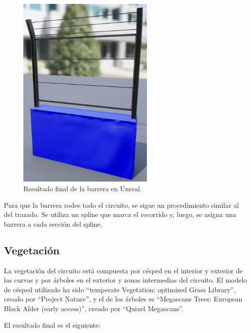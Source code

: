 \begin{figure}[H]
    \centering
    \includegraphics[width=0.6\textwidth]{imagenes/barrier/barrierfence.png}
    \caption{Resultado final de la barrera en Unreal.}
    \label{fig:barreraFinal}
\end{figure}

Para que la barrera rodee todo el circuito, se sigue un procedimiento similar al del trazado. Se utiliza un spline que marca el recorrido y, luego, se asigna una barrera a cada sección del spline.

\subsection{Vegetación}

La vegetación del circuito está compuesta por césped en el interior y exterior de las curvas y por árboles en el exterior y zonas intermedias del circuito. El modelo de césped utilizado ha sido ``temperate Vegetation: optimized Grass Library''\cite{grass}, creado por ``Project Nature'', y el de los árboles es ``Megascans Trees: European Black Alder (early access)''\cite{trees}, creado por ``Quixel Megascans''.

\bigskip

El resultado final es el siguiente:

